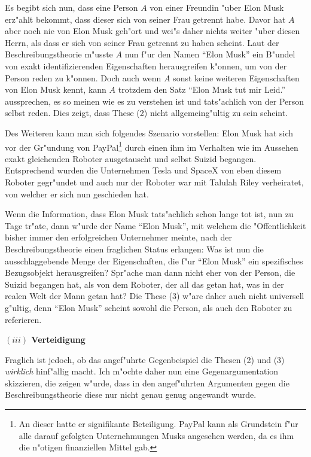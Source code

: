 \documentclass[a4paper, emulatestandardclasses, 12pt]{scrartcl}
\begin{document}
\begin{onehalfspace}
Es begibt sich nun, dass eine Person $A$ von einer Freundin "uber Elon Musk erz"ahlt bekommt, dass dieser sich von seiner Frau getrennt habe. Davor hat $A$ aber noch nie von Elon Musk geh"ort und wei"s daher nichts weiter "uber diesen Herrn, als dass er sich von seiner Frau getrennt zu haben scheint. Laut der Beschreibungstheorie m"usste $A$ nun f"ur den Namen "`Elon Musk"' ein B"undel von exakt identifizierenden Eigenschaften herausgreifen k"onnen, um von der Person reden zu k"onnen. Doch auch wenn $A$ sonst keine weiteren Eigenschaften von Elon Musk kennt, kann $A$ trotzdem den Satz "`Elon Musk tut mir Leid."' aussprechen, es so meinen wie es zu verstehen ist und tats"achlich von der Person selbst reden. Dies zeigt, dass These (2) nicht allgemeing"ultig zu sein scheint.
 
Des Weiteren kann man sich folgendes Szenario vorstellen: Elon Musk hat sich vor der Gr"undung von PayPal\footnote{An dieser hatte er signifikante Beteiligung. PayPal kann als Grundstein f"ur alle darauf gefolgten Unternehmungen Musks angesehen werden, da es ihm die n"otigen finanziellen Mittel gab.} durch einen ihm im Verhalten wie im Aussehen exakt gleichenden Roboter ausgetauscht und selbst Suizid begangen.  Entsprechend wurden die Unternehmen Tesla und SpaceX von eben diesem Roboter gegr"undet und auch nur der Roboter war mit Talulah Riley verheiratet, von welcher er sich nun geschieden hat.

Wenn die Information, dass Elon Musk tats"achlich schon lange tot ist, nun zu Tage tr"ate, dann w"urde der Name "`Elon Musk"', mit welchem die "Offentlichkeit bisher immer den erfolgreichen Unternehmer meinte, nach der Beschreibungstheorie einen fraglichen Status erlangen: Was ist nun die ausschlaggebende Menge der Eigenschaften, die f"ur "`Elon Musk"' ein spezifisches Bezugsobjekt herausgreifen? Spr"ache man dann nicht eher von der Person, die Suizid begangen hat, als von dem Roboter, der all das getan hat, was in der realen Welt der Mann getan hat? Die These (3) w"are daher auch nicht universell g"ultig, denn "`Elon Musk"' scheint sowohl die Person, als auch den Roboter zu referieren.

\vspace{5mm}
\noindent\textbf{$(iii)$ Verteidigung}	

\noindent Fraglich ist jedoch, ob das angef"uhrte Gegenbeispiel die Thesen (2) und (3) \emph{wirklich} hinf"allig macht. Ich m"ochte daher nun eine Gegenargumentation skizzieren, die zeigen w"urde, dass in den angef"uhrten Argumenten gegen die Beschreibungstheorie diese nur nicht genau genug angewandt wurde.


\end{onehalfspace}
\end{document}
